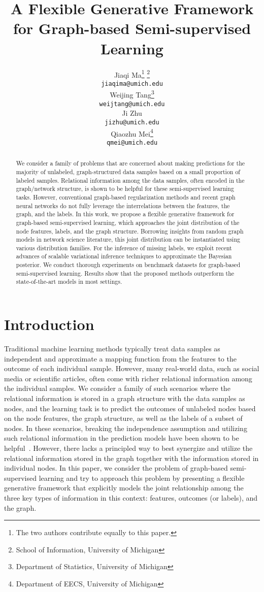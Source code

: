 \documentclass{article}
\title{A Flexible Generative Framework for Graph-based Semi-supervised Learning}
\author{Jiaqi Ma\thanks{The two authors contribute equally to this paper.}  \thanks{School of Information, University of Michigan}\\
    \texttt{jiaqima@umich.edu} \\
    \And
    Weijing Tang\footnotemark[1]  \thanks{Department of Statistics, University of Michigan}\\
    \texttt{weijtang@umich.edu} \\
    \And
    Ji Zhu\footnotemark[3]\\
    \texttt{jizhu@umich.edu} \\
    \And
    Qiaozhu Mei\footnotemark[2]  \thanks{Department of EECS, University of Michigan}\\
    \texttt{qmei@umich.edu} \\
}
\begin{document}
\maketitle

\begin{abstract}
We consider a family of problems that are concerned about making predictions for the majority of unlabeled, graph-structured data samples based on a small proportion of labeled samples.  Relational information among the data samples, often encoded in the graph/network structure, is shown to be helpful for these semi-supervised learning tasks. However, conventional graph-based regularization methods and recent graph neural networks do not fully leverage the interrelations between the features, the graph, and the labels. In this work, we propose a flexible generative framework for graph-based semi-supervised learning, which approaches the joint distribution of the node features, labels, and the graph structure. Borrowing insights from random graph models in network science literature, this joint distribution can be instantiated using various distribution families. For the inference of missing labels, we exploit recent advances of scalable variational inference techniques to approximate the Bayesian posterior. We conduct thorough experiments on benchmark datasets for graph-based semi-supervised learning. Results show that the proposed methods outperform the state-of-the-art models in most settings. 

\end{abstract}

\section{Introduction}
\label{sec:intro}

Traditional machine learning methods typically treat data samples as independent and approximate a mapping function from the features to the outcome of each individual sample. However, many real-world data, such as social media or scientific articles, often come with richer relational information among the individual samples. We consider a family of such scenarios where the relational information is stored in a graph structure with the data samples as nodes, and the learning task is to predict the outcomes of unlabeled nodes based on the node features, the graph structure, as well as the labels of a subset of nodes. In these scenarios, breaking the independence assumption and utilizing such relational information in the prediction models have been shown to be helpful~\cite{zhu2003semi,zhou2004learning,belkin2006manifold,kipf2016semi,hamilton2017inductive,mei2008general,li2019prediction}. However, there lacks a principled way to best synergize and utilize the relational information stored in the graph together with the information stored in individual nodes. In this paper, we consider the problem of graph-based semi-supervised learning and try to approach this problem by presenting a flexible generative framework that explicitly models the joint relationship among the three key types of information in this context: features, outcomes (or labels), and the graph. 
\end{document}
